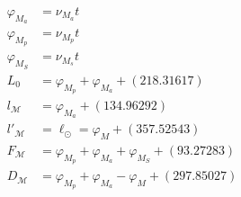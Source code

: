 \documentclass[11pt,
               a4paper,
               bibtotoc,
               idxtotoc,
               headsepline,
               footsepline,
               footexclude,
               BCOR12mm,
               DIV13,
               openany,   %
               ]
               {scrbook}
\begin{document}
\begin{itemize}
\begin{equation}
\begin{array}{ll}
                \varphi_{M_a}&=\nu_{M_a}t\\
                \varphi_{M_p}&=\nu_{M_p}t\\
                \varphi_{M_S}&=\nu_{M_s}t\\
                L_0&=\varphi_{M_p}+\varphi_{M_a}+ (218.31617)\\
                l_{\mathcal M}&=\varphi_{M_a}+ (134.96292)\\
                l'_{\mathcal M}&=\ell_{\odot}=\varphi_M+ (357.52543)\\
                F_{\mathcal M}&=\varphi_{M_p}+\varphi_{M_a}+\varphi_{M_S}+ (93.27283)\\
                D_{\mathcal M}&=\varphi_{M_p}+\varphi_{M_a}-\varphi_{M}+ (297.85027)
            \end{array}
        \end{equation}


\end{itemize}
\end{document}
